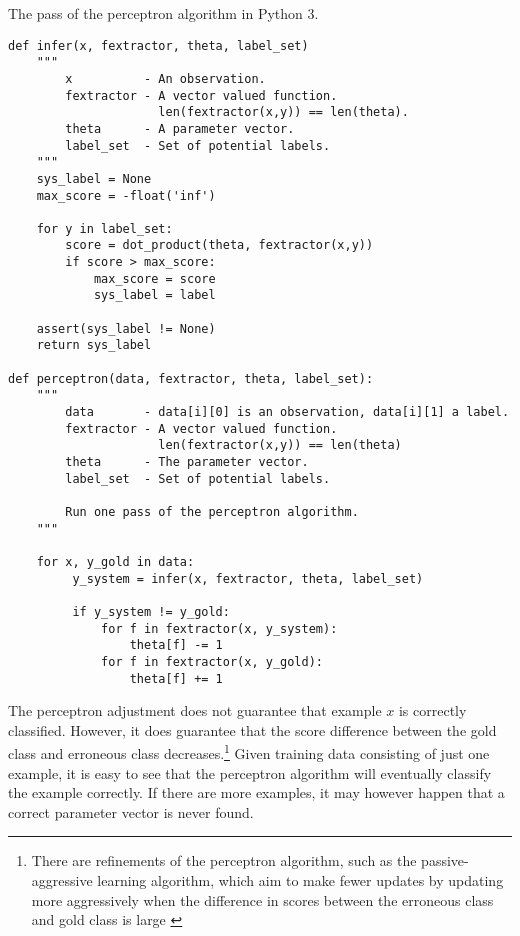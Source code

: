 \begin{algorithm}[!p]
\begin{center}
\caption{The pass of the perceptron algorithm in Python 3.}\label{forward-algorithm}
\begin{lstlisting}[linewidth=\textwidth]
def infer(x, fextractor, theta, label_set)
    """
        x          - An observation.
        fextractor - A vector valued function. 
                     len(fextractor(x,y)) == len(theta). 
        theta      - A parameter vector.
        label_set  - Set of potential labels. 
    """
    sys_label = None
    max_score = -float('inf')
 
    for y in label_set:
        score = dot_product(theta, fextractor(x,y))
        if score > max_score:
            max_score = score
            sys_label = label

    assert(sys_label != None)
    return sys_label

def perceptron(data, fextractor, theta, label_set): 
    """
        data       - data[i][0] is an observation, data[i][1] a label.
        fextractor - A vector valued function. 
                     len(fextractor(x,y)) == len(theta) 
        theta      - The parameter vector.
        label_set  - Set of potential labels. 

        Run one pass of the perceptron algorithm.
    """

    for x, y_gold in data:
         y_system = infer(x, fextractor, theta, label_set)
         
         if y_system != y_gold:
             for f in fextractor(x, y_system):
                 theta[f] -= 1
             for f in fextractor(x, y_gold):
                 theta[f] += 1
\end{lstlisting}
\end{center}
\end{algorithm}

The perceptron adjustment does not guarantee that example $x$ is
correctly classified. However, it does guarantee that the score
difference between the gold class and erroneous class decreases.\footnote{There are refinements of the perceptron algorithm, such as the passive-aggressive learning algorithm, which aim to make fewer updates by updating more aggressively when the difference in scores between the erroneous class and gold class is large \citep{Crammer2006}} Given
training data consisting of just one example, it is easy to see that
the perceptron algorithm will eventually classify the example
correctly. If there are more examples, it may however happen that a
correct parameter vector is never found.

